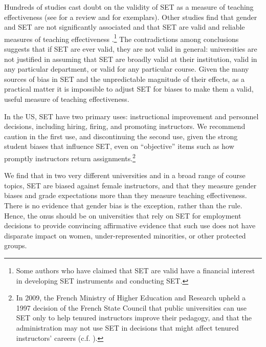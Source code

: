 \documentclass[12pt]{article}
\begin{document}
Hundreds of studies cast doubt on the validity of SET as a measure of teaching effectiveness 
(see \citet{Pounder2007} for a review and \citet{Galbraith2012,Carrell2010a} for exemplars). 
Other studies find that gender and SET are not significantly associated \citep{Bennett1982,Centra2000,Elmore1974} and that SET are valid and reliable measures of teaching effectiveness \citep{Benton2012,Centra1977}.\footnote{%
  Some authors who have claimed that SET are valid have a financial interest in 
  developing SET instruments and conducting SET.
} 
The contradictions among conclusions suggests that if SET are ever valid, they
are not valid in general: universities are not justified in assuming that SET are broadly valid at their
institution, valid in any particular department, or valid for any particular course. 
Given the many sources of bias in 
SET and the unpredictable magnitude of their effects, as a practical matter it is impossible to adjust
SET for biases to make them a valid, useful measure of teaching effectiveness. 

In the US, SET have two primary uses: 
instructional improvement and personnel 
decisions, including hiring, firing, and promoting instructors. 
We recommend caution in the first use, and discontinuing the second use, 
given the strong student biases that 
influence SET, even on ``objective'' items such as how promptly instructors return
assignments.\footnote{%
  In 2009, the French Ministry of Higher Education and Research upheld a 1997 
  decision of the French State Council that public universities can use SET only to help 
  tenured instructors improve their pedagogy, and that the administration may not use 
  SET in decisions that might affect  tenured instructors' careers (c.f. \citet{Boring2015ofce}). 
}

We find that in two very different universities and in a broad range of course topics, 
SET are biased against female instructors, and that
they measure gender biases and grade expectations more than they measure teaching 
effectiveness.
There is no evidence that gender bias is the exception, rather than the rule.
Hence, the onus should be on universities 
that rely on SET for employment decisions to provide convincing affirmative evidence
that such use does not have disparate impact on women,
under-represented minorities, or other protected groups.



\end{document}
